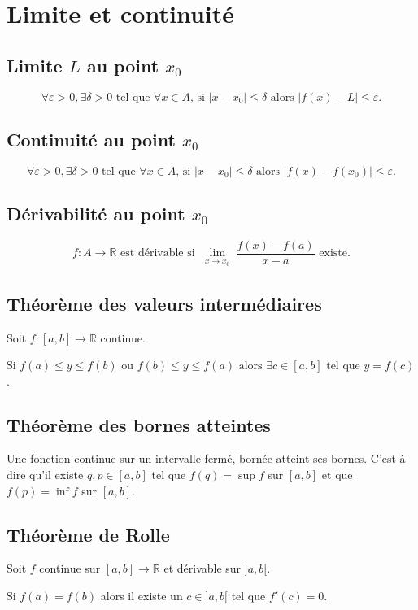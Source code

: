 \section{Limite et continuité}
\subsection{Limite $L$ au point $x_0$}
\[ \forall \varepsilon > 0, \exists \delta > 0 \text{ tel que }
\forall x \in A\text{, si }|x - x_0| \leq \delta \text{ alors }
|f(x) - L| \leq \varepsilon. \]

\subsection{Continuité au point $x_0$}
\[ \forall \varepsilon > 0, \exists \delta > 0 \text{ tel que }
\forall x \in A\text{, si }|x - x_0| \leq \delta \text{ alors }
|f(x) - f(x_0)| \leq \varepsilon. \]

\subsection{Dérivabilité au point $x_0$}
\[ f : A \rightarrow \mathbb{R} \text{ est dérivable si }
\lim_{\substack{x \rightarrow x_0}} \frac{f(x) - f(a)}{x - a} \text{ existe.} \]

\subsection{Théorème des valeurs intermédiaires}
Soit $f : [a,b] \rightarrow \mathbb{R}$ continue.

Si $f(a) \leq y \leq f(b)$ ou $f(b) \leq y \leq f(a)\text{ alors }
\exists c \in [a,b] \text{ tel que } y = f(c)$.

\subsection{Théorème des bornes atteintes}
Une fonction continue sur un intervalle fermé, bornée atteint ses bornes.
C'est à dire qu'il existe $q, p \in [a,b]$ tel que
$f(q) = \sup f$ sur $[a,b]$
et que $f(p) = \inf f$ sur $[a,b]$.

\subsection{Théorème de Rolle}
Soit $f$ continue sur $ [a,b] \to \mathbb{R}$ et dérivable sur $]a,b[$.

Si $f(a) = f(b)$ alors il existe un $c \in ]a,b[$ tel que $f'(c) = 0$.

